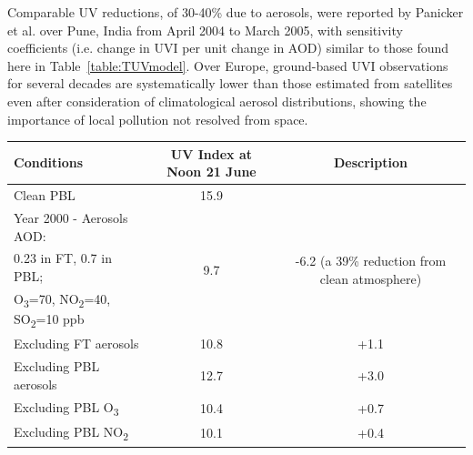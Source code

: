 \documentclass[10pt]{article}
\begin{document}
{Comparable UV reductions, of 30-40\% due to aerosols, were reported by
Panicker et al.}\cite{Panicker_2009}{ over Pune, India from April 2004 to
  March 2005, with sensitivity coefficients (i.e. change in UVI per unit
  change in AOD) similar to those found here in
  Table~}{\ref{table:TUVmodel}}{. Over Europe,
  ground-based UVI observations for several decades are systematically
  lower than those estimated from satellites even after consideration of
  climatological aerosol distributions, showing the importance of local
  pollution not resolved from space.}\cite{Vitt_2020}
\begin{table}[H]
  \centering
  \begin{tabular}{lcc} \hline
    \textbf{Conditions}               & \textbf{UV Index at Noon 21 June} & \textbf{Description}                                                                                                                       \\ \hline
    Clean PBL                         & 15.9                              &                                                                                                                                            \\ \hline
    Year 2000 - Aerosols AOD:         & \multirow{3}{*}{9.7}              & \multirow{3}{5cm}{-6.2 (a 39\% reduction from clean atmosphere)}                                                                           \\ 0.23 in FT, 0.7 in PBL;\\ O\textsubscript{3}=70, NO\textsubscript{2}=40, SO\textsubscript{2}=10 ppb\\ \hline
    Excluding FT aerosols             & 10.8                              & +1.1                                                                                                                                       \\\hline
    Excluding PBL aerosols            & 12.7                              & +3.0                                                                                                                                       \\\hline
    Excluding PBL O\textsubscript{3}  & 10.4                              & +0.7                                                                                                                                       \\\hline
    Excluding PBL NO\textsubscript{2} & 10.1                              & +0.4                                                                                                                                       \\\hline

\end{tabular}
\end{table}
\end{document}
